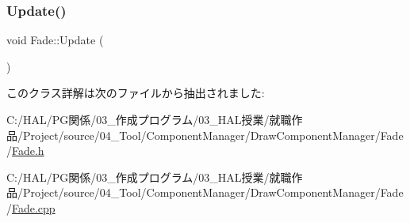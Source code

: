 \subsubsection{\texorpdfstring{Update()}{Update()}}
{\footnotesize\ttfamily void Fade\+::\+Update (\begin{DoxyParamCaption}{ }\end{DoxyParamCaption})}



このクラス詳解は次のファイルから抽出されました\+:\begin{DoxyCompactItemize}
\item 
C\+:/\+H\+A\+L/\+P\+G関係/03\+\_\+作成プログラム/03\+\_\+\+H\+A\+L授業/就職作品/\+Project/source/04\+\_\+\+Tool/\+Component\+Manager/\+Draw\+Component\+Manager/\+Fade/\mbox{\hyperlink{_fade_8h}{Fade.\+h}}\item 
C\+:/\+H\+A\+L/\+P\+G関係/03\+\_\+作成プログラム/03\+\_\+\+H\+A\+L授業/就職作品/\+Project/source/04\+\_\+\+Tool/\+Component\+Manager/\+Draw\+Component\+Manager/\+Fade/\mbox{\hyperlink{_fade_8cpp}{Fade.\+cpp}}\end{DoxyCompactItemize}

